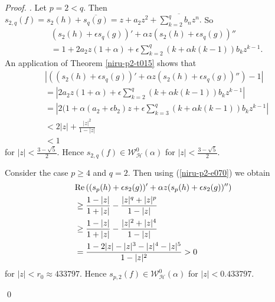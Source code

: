\documentclass[a4paper,12pt]{amsart}
\theoremstyle{plain}
\theoremstyle{definition}
\newenvironment{pf}[1][]{ \vskip 3mm
 \noindent
 \ifthenelse{\equal{#1}{}}  {{\slshape Proof. }}  {{\slshape #1.} } }{\qed\bigskip}
\begin{document}
\begin{pf}
Let $p = 2 < q$. Then $s_{2, q}(f) = s_2 (h) + \overline{s_q(g)} = z + a_2 z^2 + \overline{\sum_{k = 2}^{q}b_n z^n}.$
So
\begin{align*}
&(s_2(h) + \epsilon s_q(g))' + \alpha z (s_2(h) + \epsilon s_q(g))''\\
& = 1 + 2a_2z(1 + \alpha) + \epsilon \sum_{k=2}^{q}(k + \alpha k(k-1))b_k z^{k-1}.
\end{align*}
An application of Theorem \ref{niru-p2-t015} shows that 
\begin{align*}
&|((s_2(h) + \epsilon s_q(g))' + \alpha z (s_2(h) + \epsilon s_q(g))'') - 1|\\
& = \left|2a_2z(1 + \alpha) + \epsilon \sum_{k=2}^{q}(k + \alpha k(k-1))b_k z^{k-1}\right|\\
& = \left|2(1 + \alpha(a_2 + \epsilon b_2)z + \epsilon \sum_{k=3}^{q}(k + \alpha k(k-1))b_k z^{k-1}\right|\\
& < 2 |z| + \frac{|z|^2}{1 - |z|}\\
& <1
\end{align*}
for  $|z|< \frac{3 - \surd5}{2}.$ Hence $s_{2,q}(f)\in\mathcal{W}^0_{\mathcal{H}}(\alpha)$ for  $|z|< \frac{3 - \surd5}{2}.$

Consider the case $p\geq 4$ and $q =2$. Then using (\ref{niru-p2-e070}) we obtain
\begin{align*}
&{\rm Re\,}((s_p(h) + \epsilon s_2(g))' + \alpha z (s_p(h) + \epsilon s_2(g))'')\\
&\geq \frac{1-|z|}{1 + |z|} - \frac{|z|^q + |z|^p}{1 - |z|}\\
&\geq \frac{1-|z|}{1 + |z|} - \frac{|z|^2 + |z|^4}{1 - |z|}\\
& = \frac{1 - 2|z| - |z|^3 - |z|^4 - |z|^5}{1 - |z|^2} > 0
\end{align*}
for $|z|< r_{0} \approx 433797$. Hence $s_{p,2}(f)\in\mathcal{W}^0_{\mathcal{H}}(\alpha)$ for $|z|< 0.433797$.

\end{pf}
\end{document}

